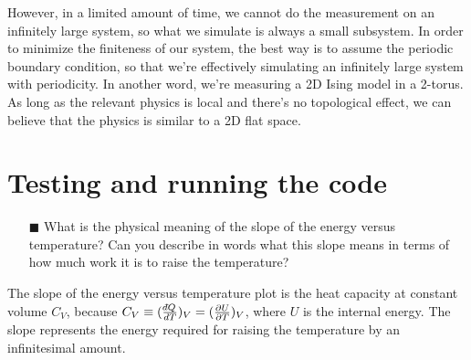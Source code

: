 \documentclass[11pt]{article}
\def\dbar{{\mathchar'26\mkern-12mu d}}
\begin{document}
However, in a limited amount of time, we cannot do the measurement on an infinitely large system, so what we simulate is always a small subsystem. In order to minimize the finiteness of our system, the best way is to assume the periodic boundary condition, so that we're effectively simulating an infinitely large system with periodicity. In another word, we're measuring a 2D Ising model in a 2-torus. As long as the relevant physics is local and there's no topological effect, we can believe that the physics is similar to a 2D flat space.

\section{Testing and running the code}
\begin{itemize}
    \item[$\blacksquare$] What is the physical meaning of the slope of the energy versus temperature? Can you describe in words what this slope means in terms of how much work it is to raise the temperature?
\end{itemize}
The slope of the energy versus temperature plot is the heat capacity at constant volume $C_V$, because $C_V \equiv (\frac{\dbar Q}{dT})_V = (\frac{\partial U}{\partial T})_V$, where $U$ is the internal energy. The slope represents the energy required for raising the temperature by an infinitesimal amount.




\end{document}
